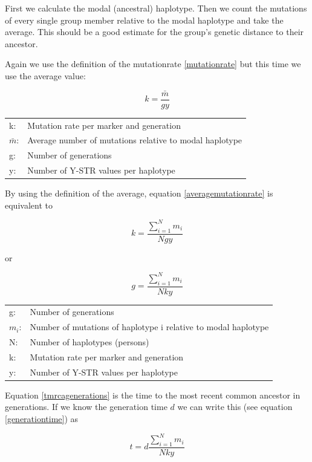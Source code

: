 First we calculate the modal (ancestral) haplotype. Then we
count the mutations of every single group member relative to
the modal haplotype and take the average. This should be a
good estimate for the group's genetic distance to their ancestor. 

Again we use the definition of the mutationrate \ref{mutationrate}
but this time we use the average value:

\begin{equation}
k = \frac{\bar{m}}{g y} \label{averagemutationrate}
\end{equation}

\begin{tabular}{ll}
k: &  Mutation rate per marker and generation\\
$\bar{m}$: &  Average number of mutations relative to modal haplotype\\
g: &  Number of generations \\
y: &  Number of Y-STR values per haplotype
\end{tabular}
\vspace{1em}

By using the definition of the average, equation
\ref{averagemutationrate} is equivalent to

\begin{equation}
k = \frac{\sum_{i=1}^{N} m_i}{N g y}
\end{equation}

or

\begin{equation}
g = \frac{\sum_{i=1}^{N} m_i}{N k y}\label{tmrcagenerations}
\end{equation}

\begin{tabular}{ll}
g: &  Number of generations \\
$m_i$: &  Number of mutations of haplotype i relative to modal haplotype\\
N: &  Number of haplotypes (persons) \\
k: &  Mutation rate per marker and generation\\
y: &  Number of Y-STR values per haplotype
\end{tabular}
\vspace{1em}

Equation \ref{tmrcagenerations} is the time to the most recent
common ancestor in generations. If we know the generation time
$d$ we can write this (see equation \ref{generationtime}) as

\begin{equation}
t = d \frac{\sum_{i=1}^{N} m_i}{N k y}
\end{equation}

